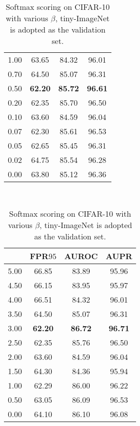 \documentclass{article}
\begin{document}
\begin{table}[t]
{{\begin{tabular}{c|ccc}
1.00               & 63.65                  & {84.32}                  & {96.01}       \\
0.70               & 64.50                  & 85.07                  & 96.31       \\
\cellcolor{greyC}0.50               & \cellcolor{greyC}\textbf{62.20}                  & \cellcolor{greyC}\textbf{85.72}                  & \cellcolor{greyC}\textbf{96.61}       \\ 
0.20               & 62.35                  & 85.70                  & 96.50       \\
0.10               & 63.60                  & 84.59                  & 96.04       \\
0.07               & 62.30                  & 85.61                  & 96.53       \\
0.05               & 62.65                  & 85.45                  & 96.31       \\ 
0.02               & 64.75                  & 85.54                  & 96.28       \\
0.00               & 63.80                  & 85.12                  & 96.36       \\
\bottomrule[1.5pt]      
\end{tabular}
}
}~~
\parbox{.30\linewidth}{
\centering
\caption{Softmax scoring on CIFAR-10 with various $\beta$, tiny-ImageNet is adopted as the validation set.}
\scriptsize
\vspace{5pt}
{
\begin{tabular}{c|ccc}
\toprule[1.5pt]
             & FPR$95$     & AUROC       & AUPR     \\
\midrule[0.6pt]
5.00               & 66.85                  & 83.89                  & 95.96 \\
4.50               & 66.15                  & 83.95                  & 95.97 \\
4.00               & 66.51                  & 84.32                  & 96.01 \\
3.50               & 64.50                  & 85.07                  & 96.31      \\
\cellcolor{greyC}3.00               & \cellcolor{greyC}\textbf{62.20}                  & \cellcolor{greyC}\textbf{86.72}                  & \cellcolor{greyC}\textbf{96.71} \\
2.50               & 62.35                  & 85.76                  & 96.50 \\
2.00               & 63.60                  & 84.59                  & 96.04 \\
1.50               & 64.30                  & 84.36                  & 95.94 \\
1.00               & 62.29                  & 86.00                  & 96.22 \\
0.50               & 63.05                  & 86.09                  & 96.53 \\
0.00               & 64.10                  & 86.10                 & 96.08       \\
\bottomrule[1.5pt]      
\end{tabular}
}
}
\end{table}
\end{document}
